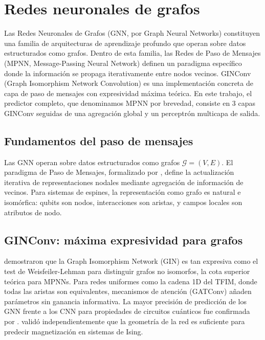 \documentclass[11pt,a4paper,spanish]{book}
\begin{document}
\section{Redes neuronales de grafos}

Las Redes Neuronales de Grafos (GNN, por Graph Neural Networks) constituyen una familia de arquitecturas de aprendizaje profundo que operan sobre datos estructurados como grafos. Dentro de esta familia, las Redes de Paso de Mensajes (MPNN, Message-Passing Neural Network) \citep{gilmer2017} definen un paradigma específico donde la información se propaga iterativamente entre nodos vecinos. GINConv (Graph Isomorphism Network Convolution) \citep{xu2019} es una implementación concreta de capa de paso de mensajes con expresividad máxima teórica. En este trabajo, el predictor completo, que denominamos MPNN por brevedad, consiste en 3 capas GINConv seguidas de una agregación global y un perceptrón multicapa de salida.

\subsection{Fundamentos del paso de mensajes}

Las GNN operan sobre datos estructurados como grafos $\mathcal{G} = (V, E)$. El paradigma de Paso de Mensajes, formalizado por \citet{gilmer2017}, define la actualización iterativa de representaciones nodales mediante agregación de información de vecinos. Para sistemas de espines, la representación como grafo es natural e isomórfica: qubits son nodos, interacciones son aristas, y campos locales son atributos de nodo.

\subsection{GINConv: máxima expresividad para grafos}

\citet{xu2019} demostraron que la Graph Isomorphism Network (GIN) es tan expresiva como el test de Weisfeiler-Lehman para distinguir grafos no isomorfos, la cota superior teórica para MPNNs. Para redes uniformes como la cadena 1D del TFIM, donde todas las aristas son equivalentes, mecanismos de atención (GATConv) añaden parámetros sin ganancia informativa. La mayor precisión de predicción de los GNN frente a los CNN para propiedades de circuitos cuánticos fue confirmada por \citet{meng2025}. \citet{slavin2025} validó independientemente que la geometría de la red es suficiente para predecir magnetización en sistemas de Ising.
\end{document}
